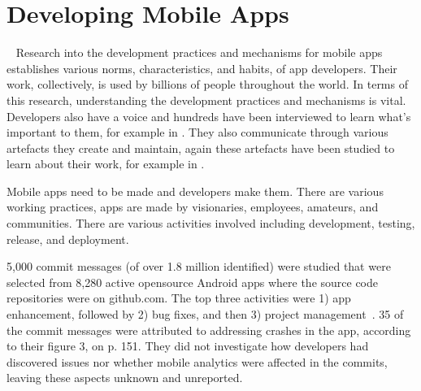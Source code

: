 \section{Developing Mobile Apps}~\label{rw-developing-mobile-apps-section}
Research into the development practices and mechanisms for mobile apps establishes various norms, characteristics, and habits, of app developers. Their work, collectively, is used by billions of people throughout the world. In terms of this research, understanding the development practices and mechanisms is vital. Developers also have a voice and hundreds have been interviewed to learn what's important to them, for example in . They also communicate through various artefacts they create and maintain, again these artefacts have been studied to learn about their work, for example in .


Mobile apps need to be made and developers make them. There are various working practices, apps are made by visionaries, employees, amateurs, and communities. There are various activities involved including development, testing, release, and deployment. %


5,000 commit messages (of over 1.8 million identified) were studied that were selected from 8,280 active opensource Android apps where the source code repositories were on github.com. The top three activities were 1) app enhancement, followed by 2) bug fixes, and then 3) project management~. 35 of the commit messages were attributed to addressing crashes in the app, according to their figure 3, on p. 151. They did not investigate how developers had discovered issues nor whether mobile analytics were affected in the commits, leaving these aspects unknown and unreported.

